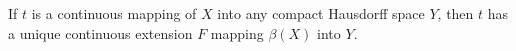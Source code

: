 If $t$ is a continuous mapping of $X$ into any compact Hausdorff space $Y$, then $t$ has a unique continuous extension $F$ mapping $\beta(X)$ into $Y$.
